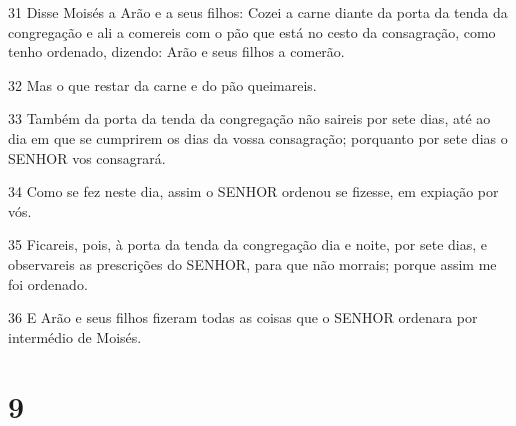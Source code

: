 \par 31 Disse Moisés a Arão e a seus filhos: Cozei a carne diante da porta da tenda da congregação e ali a comereis com o pão que está no cesto da consagração, como tenho ordenado, dizendo: Arão e seus filhos a comerão.
\par 32 Mas o que restar da carne e do pão queimareis.
\par 33 Também da porta da tenda da congregação não saireis por sete dias, até ao dia em que se cumprirem os dias da vossa consagração; porquanto por sete dias o SENHOR vos consagrará.
\par 34 Como se fez neste dia, assim o SENHOR ordenou se fizesse, em expiação por vós.
\par 35 Ficareis, pois, à porta da tenda da congregação dia e noite, por sete dias, e observareis as prescrições do SENHOR, para que não morrais; porque assim me foi ordenado.
\par 36 E Arão e seus filhos fizeram todas as coisas que o SENHOR ordenara por intermédio de Moisés.

\chapter{9}


